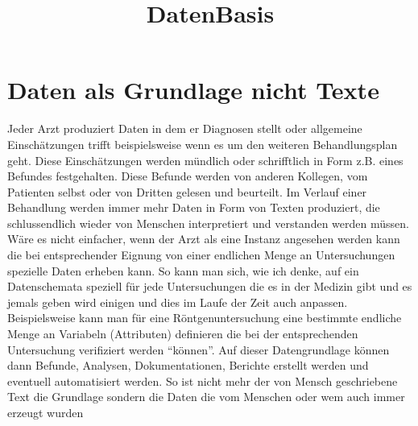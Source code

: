 \documentclass[]{article}
\title{DatenBasis}
\author{}
\date{}
\begin{document}
\maketitle


{
\hypersetup{linkcolor=black}
\setcounter{tocdepth}{2}
\tableofcontents
}
\section{Daten als Grundlage nicht
Texte}\label{daten-als-grundlage-nicht-texte}

Jeder Arzt produziert Daten in dem er Diagnosen stellt oder allgemeine
Einschätzungen trifft beispielsweise wenn es um den weiteren
Behandlungsplan geht. Diese Einschätzungen werden mündlich oder
schrifftlich in Form z.B. eines Befundes festgehalten. Diese Befunde
werden von anderen Kollegen, vom Patienten selbst oder von Dritten
gelesen und beurteilt. Im Verlauf einer Behandlung werden immer mehr
Daten in Form von Texten produziert, die schlussendlich wieder von
Menschen interpretiert und verstanden werden müssen. Wäre es nicht
einfacher, wenn der Arzt als eine Instanz angesehen werden kann die bei
entsprechender Eignung von einer endlichen Menge an Untersuchungen
spezielle Daten erheben kann. So kann man sich, wie ich denke, auf ein
Datenschemata speziell für jede Untersuchungen die es in der Medizin
gibt und es jemals geben wird einigen und dies im Laufe der Zeit auch
anpassen. Beispielsweise kann man für eine Röntgenuntersuchung eine
bestimmte endliche Menge an Variabeln (Attributen) definieren die bei
der entsprechenden Untersuchung verifiziert werden ``können''. Auf
dieser Datengrundlage können dann Befunde, Analysen, Dokumentationen,
Berichte erstellt werden und eventuell automatisiert werden. So ist
nicht mehr der von Mensch geschriebene Text die Grundlage sondern die
Daten die vom Menschen oder wem auch immer erzeugt wurden
\end{document}
